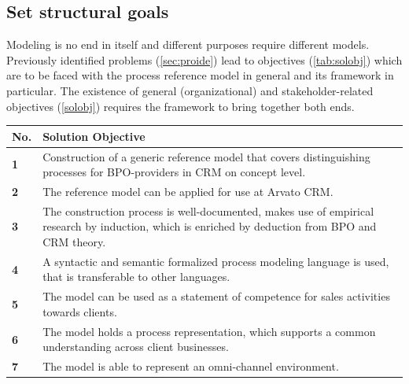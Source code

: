 	\subsection{Set structural goals}
	
	Modeling is no end in itself and different purposes require different models. Previously identified problems (\ref{sec:proide}) lead to objectives (\ref{tab:solobj}) which are to be faced with the process reference model in general and its framework in particular. The existence of general (organizational) and stakeholder-related objectives (\cf \Tab \ref{solobj}) requires the framework to bring together both ends.
	
	\begin{table}[caption={Solution Objectives}, label={tab:solobj}]
		\centering
		\begin{tabular}{l p{13.3cm}}

			\textbf{No. }&\textbf{ Solution Objective}
			 \\ \hline
			\textbf{1 }                        & Construction of a generic reference model that covers distinguishing processes for BPO-providers in CRM on concept level.                                                    \\ \hline
			\textbf{2}                         & The reference model can be applied for use at Arvato CRM.                                                                                                                    \\ \hline
			\textbf{3 }                        & The construction process is well-documented, makes use of empirical research by induction, which is enriched by deduction from \acrshort{BPO} and \acrshort{CRM} theory. \\ \hline
			\textbf{4}                         & A syntactic and semantic formalized process modeling language is used, that is transferable to other languages.                                                              \\ \hline
			\textbf{5}                         & The model can be used as a statement of competence for sales activities towards clients.                                                                                     \\ \hline
			\textbf{6}                         & The model holds a process representation, which supports a common understanding across client businesses.                                                                    \\ \hline
			\textbf{7}                         & The model is able to represent an omni-channel environment.                                                                                                                 
		\end{tabular}
	\end{table}

